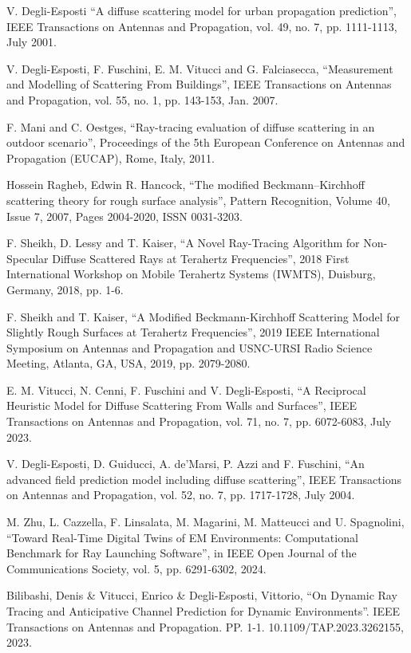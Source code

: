 \documentclass[lettersize,journal]{IEEEtran}
\begin{document}
\begin{thebibliography}{1}


V. Degli-Esposti ``A diffuse scattering model for urban propagation prediction'', IEEE Transactions on Antennas and Propagation, vol. 49, no. 7, pp. 1111-1113, July 2001.

V. Degli-Esposti, F. Fuschini, E. M. Vitucci and G. Falciasecca, ``Measurement and Modelling of Scattering From Buildings'', IEEE Transactions on Antennas and Propagation, vol. 55, no. 1, pp. 143-153, Jan. 2007.

F. Mani and C. Oestges, ``Ray-tracing evaluation of diffuse scattering in an outdoor scenario'', Proceedings of the 5th European Conference on Antennas and Propagation (EUCAP), Rome, Italy, 2011.

Hossein Ragheb, Edwin R. Hancock, ``The modified Beckmann–Kirchhoff scattering theory for rough surface analysis'', Pattern Recognition, Volume 40, Issue 7, 2007, Pages 2004-2020, ISSN 0031-3203.

F. Sheikh, D. Lessy and T. Kaiser, ``A Novel Ray-Tracing Algorithm for Non-Specular Diffuse Scattered Rays at Terahertz Frequencies'', 2018 First International Workshop on Mobile Terahertz Systems (IWMTS), Duisburg, Germany, 2018, pp. 1-6.

F. Sheikh and T. Kaiser, ``A Modified Beckmann-Kirchhoff Scattering Model for Slightly Rough Surfaces at Terahertz Frequencies'', 2019 IEEE International Symposium on Antennas and Propagation and USNC-URSI Radio Science Meeting, Atlanta, GA, USA, 2019, pp. 2079-2080.

E. M. Vitucci, N. Cenni, F. Fuschini and V. Degli-Esposti, ``A Reciprocal Heuristic Model for Diffuse Scattering From Walls and Surfaces'', IEEE Transactions on Antennas and Propagation, vol. 71, no. 7, pp. 6072-6083, July 2023.

V. Degli-Esposti, D. Guiducci, A. de'Marsi, P. Azzi and F. Fuschini, ``An advanced field prediction model including diffuse scattering'', IEEE Transactions on Antennas and Propagation, vol. 52, no. 7, pp. 1717-1728, July 2004.

M. Zhu, L. Cazzella, F. Linsalata, M. Magarini, M. Matteucci and U. Spagnolini, ``Toward Real-Time Digital Twins of EM Environments: Computational Benchmark for Ray Launching Software'', in IEEE Open Journal of the Communications Society, vol. 5, pp. 6291-6302, 2024.

Bilibashi, Denis & Vitucci, Enrico & Degli-Esposti, Vittorio, ``On Dynamic Ray Tracing and Anticipative Channel Prediction for Dynamic Environments''. IEEE Transactions on Antennas and Propagation. PP. 1-1. 10.1109/TAP.2023.3262155, 2023.

\end{thebibliography}
\end{document}
